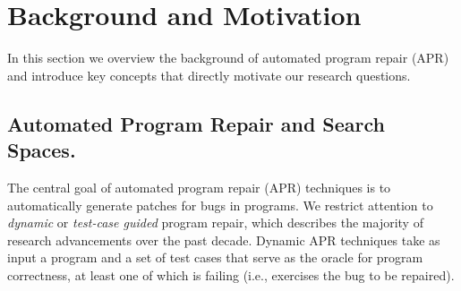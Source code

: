 \documentclass[10pt, conference]{IEEEtran}
\begin{document}
\section{Background and Motivation}
\label{sec:background}

In this section we overview the background of automated program repair (APR) and
introduce key concepts that directly motivate our research questions.

\subsection{Automated Program Repair and Search Spaces.}
The central goal of automated program repair (APR) techniques is to
automatically generate patches for bugs in programs. We restrict attention to
\emph{dynamic} or \emph{test-case guided} program repair, which describes the
majority of research advancements over the past decade. Dynamic APR techniques
take as input a program and a set of test cases that serve as the oracle for
program correctness, at least one of which is failing (i.e., exercises the bug
to be repaired).
\end{document}
